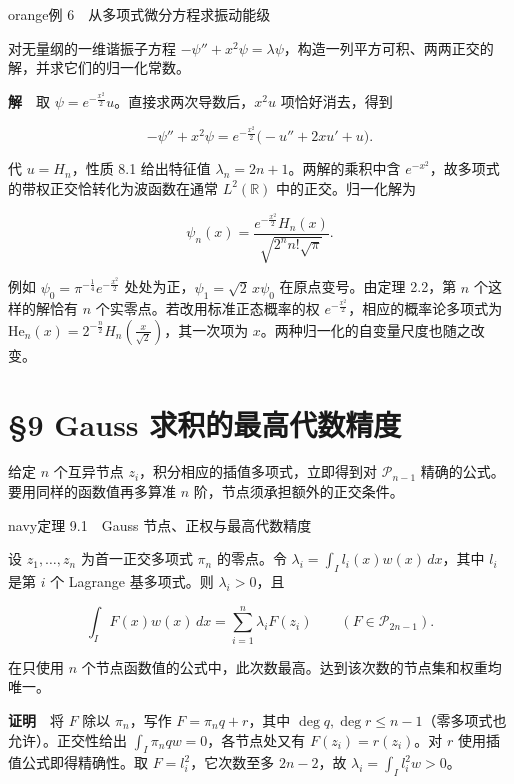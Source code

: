 \documentclass[11pt,a4paper]{article}
\newcommand{\lectureheading}[1]{\section{#1}}
\begin{document}
\begin{sboxenv}{orange}{例 6　从多项式微分方程求振动能级}

对无量纲的一维谐振子方程 \(-\psi''+x^2\psi=\lambda\psi\)，构造一列平方可积、两两正交的解，并求它们的归一化常数。

\end{sboxenv}

\textbf{解}　取 \(\psi=e^{-\frac{x^2}{2}}u\)。直接求两次导数后，\(x^2u\) 项恰好消去，得到

\[
-\psi''+x^2\psi=e^{-\frac{x^2}{2}}\bigl(-u''+2xu'+u\bigr).
\]

代 \(u=H_n\)，性质 8.1 给出特征值 \(\lambda_n=2n+1\)。两解的乘积中含 \(e^{-x^2}\)，故多项式的带权正交恰转化为波函数在通常 \(L^2(\mathbb R)\) 中的正交。归一化解为

\[
\psi_n(x)=\frac{e^{-\frac{x^2}{2}}H_n(x)}{\sqrt{2^n n!\sqrt\pi}} .
\]

例如 \(\psi_0=\pi^{-\frac{1}{4}}e^{-\frac{x^2}{2}}\) 处处为正，\(\psi_1=\sqrt2\,x\psi_0\) 在原点变号。由定理 2.2，第 \(n\) 个这样的解恰有 \(n\) 个实零点。若改用标准正态概率的权 \(e^{-\frac{x^2}{2}}\)，相应的概率论多项式为 \(\mathrm{He}_n(x)=2^{-\frac{n}{2}}H_n(\frac{x}{\sqrt2})\)，其一次项为 \(x\)。两种归一化的自变量尺度也随之改变。

\clearpage\lectureheading{§9 Gauss 求积的最高代数精度}

给定 \(n\) 个互异节点 \(z_i\)，积分相应的插值多项式，立即得到对 \(\mathcal P_{n-1}\) 精确的公式。要用同样的函数值再多算准 \(n\) 阶，节点须承担额外的正交条件。

\begin{sboxenv}{navy}{定理 9.1　Gauss 节点、正权与最高代数精度}

设 \(z_1,\ldots,z_n\) 为首一正交多项式 \(\pi_n\) 的零点。令 \(\lambda_i=\int_I l_i(x)w(x)\,dx\)，其中 \(l_i\) 是第 \(i\) 个 Lagrange 基多项式。则 \(\lambda_i>0\)，且

\[
\int_I F(x)w(x)\,dx=\sum_{i=1}^n\lambda_i F(z_i)
\qquad (F\in\mathcal P_{2n-1}).
\]

在只使用 \(n\) 个节点函数值的公式中，此次数最高。达到该次数的节点集和权重均唯一。

\end{sboxenv}

\textbf{证明}　将 \(F\) 除以 \(\pi_n\)，写作 \(F=\pi_n q+r\)，其中 \(\deg q,\deg r\le n-1\)（零多项式也允许）。正交性给出 \(\int_I \pi_n q w=0\)，各节点处又有 \(F(z_i)=r(z_i)\)。对 \(r\) 使用插值公式即得精确性。取 \(F=l_i^2\)，它次数至多 \(2n-2\)，故 \(\lambda_i=\int_I l_i^2w>0\)。
\end{document}

